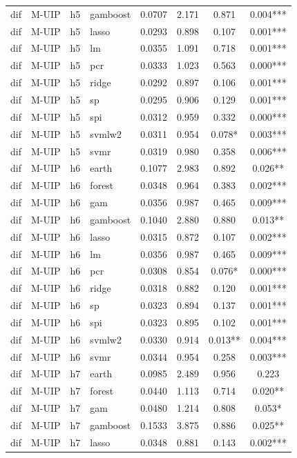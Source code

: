 \begin{ThreePartTable}
\begin{longtable}[t]{llclcccc}
dif & M-UIP & h5 & gamboost & 0.0707 & 2.171 & 0.871 & 0.004***\\
dif & M-UIP & h5 & lasso & 0.0293 & 0.898 & 0.107 & 0.001***\\
dif & M-UIP & h5 & lm & 0.0355 & 1.091 & 0.718 & 0.001***\\
dif & M-UIP & h5 & pcr & 0.0333 & 1.023 & 0.563 & 0.000***\\
dif & M-UIP & h5 & ridge & 0.0292 & 0.897 & 0.106 & 0.001***\\
dif & M-UIP & h5 & sp & 0.0295 & 0.906 & 0.129 & 0.001***\\
dif & M-UIP & h5 & spi & 0.0312 & 0.959 & 0.332 & 0.000***\\
dif & M-UIP & h5 & svmlw2 & 0.0311 & 0.954 & 0.078* & 0.003***\\
dif & M-UIP & h5 & svmr & 0.0319 & 0.980 & 0.358 & 0.006***\\
\addlinespace
dif & M-UIP & h6 & earth & 0.1077 & 2.983 & 0.892 & 0.026**\\
dif & M-UIP & h6 & forest & 0.0348 & 0.964 & 0.383 & 0.002***\\
dif & M-UIP & h6 & gam & 0.0356 & 0.987 & 0.465 & 0.009***\\
dif & M-UIP & h6 & gamboost & 0.1040 & 2.880 & 0.880 & 0.013**\\
dif & M-UIP & h6 & lasso & 0.0315 & 0.872 & 0.107 & 0.002***\\
dif & M-UIP & h6 & lm & 0.0356 & 0.987 & 0.465 & 0.009***\\
dif & M-UIP & h6 & pcr & 0.0308 & 0.854 & 0.076* & 0.000***\\
dif & M-UIP & h6 & ridge & 0.0318 & 0.882 & 0.120 & 0.001***\\
dif & M-UIP & h6 & sp & 0.0323 & 0.894 & 0.137 & 0.001***\\
dif & M-UIP & h6 & spi & 0.0323 & 0.895 & 0.102 & 0.001***\\
dif & M-UIP & h6 & svmlw2 & 0.0330 & 0.914 & 0.013** & 0.004***\\
dif & M-UIP & h6 & svmr & 0.0344 & 0.954 & 0.258 & 0.003***\\
\addlinespace
dif & M-UIP & h7 & earth & 0.0985 & 2.489 & 0.956 & 0.223\\
dif & M-UIP & h7 & forest & 0.0440 & 1.113 & 0.714 & 0.020**\\
dif & M-UIP & h7 & gam & 0.0480 & 1.214 & 0.808 & 0.053*\\
dif & M-UIP & h7 & gamboost & 0.1533 & 3.875 & 0.886 & 0.025**\\
dif & M-UIP & h7 & lasso & 0.0348 & 0.881 & 0.143 & 0.002***\\

\end{longtable}
\end{ThreePartTable}
